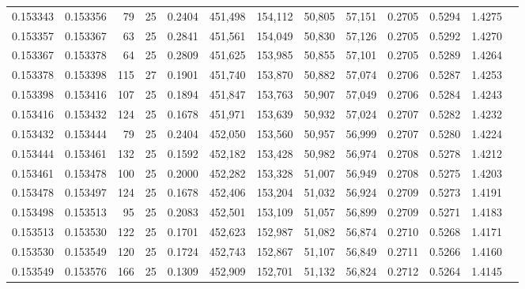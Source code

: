 \begin{tabular}{rrrrrrrrrrrrr}
0.153343 & 0.153356 &    79 &  25 &                                     0.2404 & 451,498 & 154,112 &  50,805 &  57,151 & 0.2705 & 0.5294 & 1.4275 \\
0.153357 & 0.153367 &    63 &  25 &                                     0.2841 & 451,561 & 154,049 &  50,830 &  57,126 & 0.2705 & 0.5292 & 1.4270 \\
0.153367 & 0.153378 &    64 &  25 &                                     0.2809 & 451,625 & 153,985 &  50,855 &  57,101 & 0.2705 & 0.5289 & 1.4264 \\
0.153378 & 0.153398 &   115 &  27 &                                     0.1901 & 451,740 & 153,870 &  50,882 &  57,074 & 0.2706 & 0.5287 & 1.4253 \\
0.153398 & 0.153416 &   107 &  25 &                                     0.1894 & 451,847 & 153,763 &  50,907 &  57,049 & 0.2706 & 0.5284 & 1.4243 \\
0.153416 & 0.153432 &   124 &  25 &                                     0.1678 & 451,971 & 153,639 &  50,932 &  57,024 & 0.2707 & 0.5282 & 1.4232 \\
0.153432 & 0.153444 &    79 &  25 &                                     0.2404 & 452,050 & 153,560 &  50,957 &  56,999 & 0.2707 & 0.5280 & 1.4224 \\
0.153444 & 0.153461 &   132 &  25 &                                     0.1592 & 452,182 & 153,428 &  50,982 &  56,974 & 0.2708 & 0.5278 & 1.4212 \\
0.153461 & 0.153478 &   100 &  25 &                                     0.2000 & 452,282 & 153,328 &  51,007 &  56,949 & 0.2708 & 0.5275 & 1.4203 \\
0.153478 & 0.153497 &   124 &  25 &                                     0.1678 & 452,406 & 153,204 &  51,032 &  56,924 & 0.2709 & 0.5273 & 1.4191 \\
0.153498 & 0.153513 &    95 &  25 &                                     0.2083 & 452,501 & 153,109 &  51,057 &  56,899 & 0.2709 & 0.5271 & 1.4183 \\
0.153513 & 0.153530 &   122 &  25 &                                     0.1701 & 452,623 & 152,987 &  51,082 &  56,874 & 0.2710 & 0.5268 & 1.4171 \\
0.153530 & 0.153549 &   120 &  25 &                                     0.1724 & 452,743 & 152,867 &  51,107 &  56,849 & 0.2711 & 0.5266 & 1.4160 \\
0.153549 & 0.153576 &   166 &  25 &                                     0.1309 & 452,909 & 152,701 &  51,132 &  56,824 & 0.2712 & 0.5264 & 1.4145 \\

\end{tabular}
